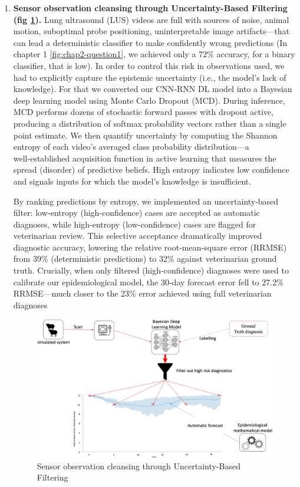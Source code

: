 \begin{enumerate}
    \item \textbf{Sensor observation cleansing through Uncertainty-Based Filtering (fig \ref{fig:chap4-method2}).} Lung ultrasound (LUS) videos are full with sources of noise, animal motion, suboptimal probe positioning, uninterpretable image artifacts—that can lead a deterministic classifier to make confidently wrong predictions (In chapter 1 \ref{fig:chap2-question1},  we achieved only a 72\% accuracy, for a binary classifier, that is low). In order to control this risk in observations used, we had to explicitly capture the epistemic uncertainty (i.e., the model’s lack of knowledge). For that we converted our CNN‑RNN DL model into a Bayesian deep learning model using Monte Carlo Dropout (MCD). During inference, MCD performs dozens of stochastic forward passes with dropout active, producing a distribution of softmax probability vectors rather than a single point estimate. We then quantify uncertainty by computing the Shannon entropy of each video’s averaged class probability distribution—a well‑established acquisition function in active learning that measures the spread (disorder) of predictive beliefs. High entropy indicates low confidence and signals inputs for which the model’s knowledge is insufficient.

    By ranking predictions by entropy, we implemented an uncertainty‑based filter: low‑entropy (high‑confidence) cases are accepted as automatic diagnoses, while high‑entropy (low‑confidence) cases are flagged for veterinarian review. This selective acceptance dramatically improved diagnostic accuracy, lowering the relative root‑mean‑square error (RRMSE) from 39\% (deterministic predictions) to 32\% against veterinarian ground truth. Crucially, when only filtered (high‑confidence) diagnoses were used to calibrate our epidemiological model, the 30‑day forecast error fell to 27.2\% RRMSE—much closer to the 23\% error achieved using full veterinarian diagnoses
    
        \begin{figure}[H]
          \includegraphics[width=\linewidth]{figures/chap4/method 2.jpg}
          \caption{Sensor observation cleansing through Uncertainty-Based Filtering}
          \label{fig:chap4-method2}
        \end{figure}


\end{enumerate}
